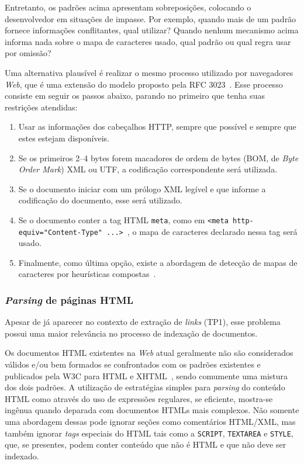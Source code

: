 \documentclass[10pt,twocolumn]{article}
\begin{document}
Entretanto, os padrões acima apresentam sobreposições, colocando o
desenvolvedor em situações de impasse. Por exemplo, quando mais de um
padrão fornece informações conflitantes, qual utilizar?  Quando nenhum
mecanismo acima informa nada sobre o mapa de caracteres usado, qual
padrão ou qual regra usar por omissão?

Uma alternativa plausível é realizar o mesmo processo utilizado por
navegadores \emph{Web}, que é uma extensão do modelo proposto pela RFC
3023~\cite{rfc3023}. Esse processo consiste em seguir os passos abaixo,
parando no primeiro que tenha suas restrições atendidas:
\begin{enumerate}
\item Usar as informações dos cabeçalhos HTTP, sempre que possível e
sempre que estes estejam disponíveis.
\item  Se os primeiros 2--4 bytes forem macadores de ordem de bytes
(BOM, de \emph{Byte Order Mark}) XML ou UTF, a codificação
correspondente será utilizada.
\item Se o documento iniciar com um prólogo XML legível e que informe a
codificação do documento, esse será utilizado.
\item Se o documento conter a tag HTML \texttt{meta}, como em \texttt{<meta
http-equiv="Content-Type" ...> }, o mapa de caracteres declarado nessa
tag será usado.
\item Finalmente, como última opção, existe a abordagem de detecção de
mapas de caracteres por heurísticas compostas~\cite{mozillaiuc}.
\end{enumerate}

\subsubsection{\emph{Parsing} de páginas HTML}\label{prob:html}

Apesar de já aparecer no contexto de extração de \emph{links} (TP1),
esse problema  possui uma maior relevância no processo de indexação
de documentos.

Os documentos HTML existentes na \emph{Web} atual geralmente não são
considerados válidos
e/ou bem formados se confrontados com os padrões existentes e publicados
pela W3C para HTML e XHTML~\cite{html4tr, bray2006xml}, sendo comumente
uma mistura dos dois padrões. A utilização de estratégias simples para
\emph{parsing} do conteúdo HTML como
através do uso de expressões regulares, se eficiente,  mostra-se ingênua
quando deparada com documentos HTMLs mais complexos. Não somente uma
abordagem dessas pode ignorar seções como comentários HTML/XML, mas
também ignorar \emph{tags} especiais do HTML tais como a \texttt{SCRIPT},
\texttt{TEXTAREA} e \texttt{STYLE}, que, se presentes, podem conter
conteúdo que não é HTML e que não deve ser indexado.
\end{document}
